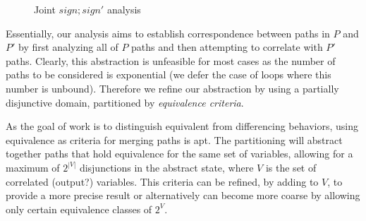 \begin{figure}
\caption{Joint $sign;sign'$ analysis}
\end{figure}
Essentially, our analysis aims to establish correspondence between paths in $P$ and $P'$ by first analyzing all of $P$ paths and then attempting to correlate with $P'$ paths. Clearly, this abstraction is unfeasible for most cases as the number of paths to be considered is exponential (we defer the case of loops where this number is unbound). Therefore we refine our abstraction by using a partially disjunctive domain, partitioned by \emph{equivalence criteria}.


As the goal of work is to distinguish equivalent from differencing behaviors, using equivalence as criteria for merging paths is apt. The partitioning will abstract together paths that hold equivalence for the same set of variables, allowing for a maximum of $2^{|V|}$ disjunctions in the abstract state, where $V$ is the set of correlated (output?) variables. This criteria can be refined, by adding to $V$, to provide a more precise result or alternatively can become more coarse by allowing only certain equivalence classes of $2^{V}$.

